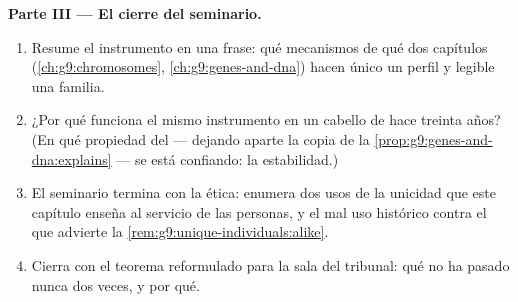 \begin{problem}
\medskip\noindent\textbf{Parte III --- El cierre del
seminario.}
\begin{enumerate}[resume]
  \item Resume el instrumento en una frase: qué mecanismos de qué dos
        capítulos (\cref{ch:g9:chromosomes},
        \cref{ch:g9:genes-and-dna}) hacen único un perfil y legible una
        familia.
  \item ¿Por qué funciona el mismo instrumento en un cabello de hace
        treinta años? (En qué propiedad del  --- dejando aparte la
        copia de la \cref{prop:g9:genes-and-dna:explains} --- se está
        confiando: la estabilidad.)
  \item El seminario termina con la ética: enumera dos usos de la
        unicidad que este capítulo enseña al servicio de las personas,
        y el mal uso histórico contra el que advierte la
        \cref{rem:g9:unique-individuals:alike}.
  \item Cierra con el teorema reformulado para la sala del tribunal:
        qué no ha pasado nunca dos veces, y por qué.
\end{enumerate}
\end{problem}
